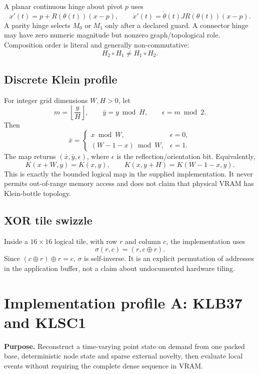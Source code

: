 \documentclass[10pt,a4paper]{article}
\begin{document}
A planar continuous hinge about pivot \(p\) uses
\[
x'(t)=p+R(\theta(t))(x-p),
\qquad
\dot{x}'(t)=\dot\theta(t)J R(\theta(t))(x-p).
\]
A parity hinge selects \(M_0\) or \(M_1\) only after a declared guard. A connector hinge may have zero numeric magnitude but nonzero graph/topological role. Composition order is literal and generally non-commutative:
\[
H_2\circ H_1\ne H_1\circ H_2.
\]

\subsection{Discrete Klein profile}

For integer grid dimensions \(W,H>0\), let
\[
m=\left\lfloor \frac{y}{H}\right\rfloor,
\qquad \bar y=y\bmod H,
\qquad \epsilon=m\bmod 2.
\]
Then
\[
\bar x=
\begin{cases}
x\bmod W,&\epsilon=0,\\
(W-1-x)\bmod W,&\epsilon=1.
\end{cases}
\]
The map returns \((\bar x,\bar y,\epsilon)\), where \(\epsilon\) is the reflection/orientation bit. Equivalently,
\[
K(x+W,y)=K(x,y),
\qquad K(x,y+H)=K(W-1-x,y).
\]
This is exactly the bounded logical map in the supplied implementation. It never permits out-of-range memory access and does not claim that physical VRAM has Klein-bottle topology.

\subsection{XOR tile swizzle}

Inside a \(16\times16\) logical tile, with row \(r\) and column \(c\), the implementation uses
\[
\sigma(r,c)=(r,c\oplus r).
\]
Since \((c\oplus r)\oplus r=c\), \(\sigma\) is self-inverse. It is an explicit permutation of addresses in the application buffer, not a claim about undocumented hardware tiling.

\section{Implementation profile A: KLB37 and KLSC1}
\label{sec:klsc1}

\begin{implementationbox}
\textbf{Purpose.} Reconstruct a time-varying point state on demand from one packed base, deterministic node state and sparse external novelty, then evaluate local events without requiring the complete dense sequence in VRAM.
\end{implementationbox}
\end{document}
